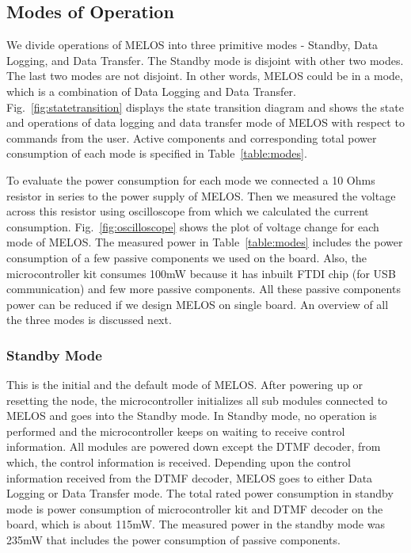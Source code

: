 \documentclass[10pt]{sigplan-proc-varsize}
\newcommand{\tabref}[1]{Table~\ref{#1}}
\newcommand{\figref}[1]{Fig.~\ref{#1}}
\newcommand{\melos}{MELOS }
\newcommand{\melosnospace}{MELOS}
\begin{document}
\subsection{Modes of Operation}
We divide operations of \melos into three primitive modes - Standby, Data Logging, and Data Transfer. The Standby mode is disjoint with other two modes. The last two modes are not disjoint. In other words, \melos could be in a mode, which is a combination of Data Logging and Data Transfer. \figref{fig:statetransition} displays the state transition diagram and shows the state and operations of data logging and data transfer mode of \melos with respect to commands from the user. Active components and corresponding total power consumption of each mode is specified  in \tabref{table:modes}. 




{}
To evaluate the power consumption for each mode we connected a 10 Ohms resistor in series to the power supply of \melosnospace. Then we measured the voltage across this resistor using oscilloscope from which we calculated the current consumption. \figref{fig:oscilloscope} shows the plot of voltage change for each mode of \melosnospace. The measured power in  \tabref{table:modes} includes the power consumption of a few passive components we used on the board. Also, the microcontroller kit consumes 100mW because it has inbuilt FTDI chip (for USB communication) and few more passive components. All these passive components power can be reduced if we design \melos on single board. An overview of all the three modes is discussed next.  

\begin{figure*}
\centering
{}
\caption{Voltage readings from oscilloscope for different modes of operation of \melosnospace.}
\label{fig:oscilloscope}
\vspace{-5mm}
\end{figure*}

\subsubsection{Standby Mode}
This is the initial and the default mode of \melosnospace. After powering up or resetting the node, the microcontroller initializes all sub modules connected to \melos and goes into the Standby mode. In Standby mode, no operation is performed and the microcontroller keeps on waiting to receive control information. All modules are powered down except the DTMF decoder, from which, the control information is received. Depending upon the control information received from the DTMF decoder, \melos goes to either Data Logging or Data Transfer mode. The total rated power consumption in standby mode is power consumption of microcontroller kit and DTMF decoder on the board, which is about 115mW. The measured power in the standby mode was 235mW that includes the power consumption of passive components.
\end{document}
